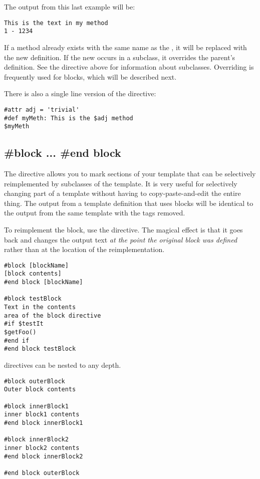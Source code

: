 The output from this last example will be:

\begin{verbatim}
This is the text in my method 
1 - 1234
\end{verbatim}

If a method already exists with the same name as the , it will be replaced
with the new definition.  If the new  occurs in a subclass, it overrides the
parent's definition.  See the  directive above for information about
subclasses.  Overriding is frequently used for blocks, which will be described next.

There is also a single line version of the  directive:

\begin{verbatim}
#attr adj = 'trivial'
#def myMeth: This is the $adj method 
$myMeth
\end{verbatim}


\subsection{\#block ... \#end block}
\label{inheritanceEtc.block}

The  directive allows you to mark sections of your template
that can be selectively reimplemented by subclasses of the template.  It is
very useful for selectively changing part of a template without having to
copy-paste-and-edit the entire thing.  The output from a template definition
that uses blocks will be identical to the output from the same template with
the  tags removed. 

To reimplement the block, use the  directive.  The magical effect is that it
goes back and changes the output text {\em at the point the original block was
defined} rather than at the location of the reimplementation.

\begin{verbatim}
#block [blockName] 
[block contents] 
#end block [blockName]

#block testBlock
Text in the contents 
area of the block directive
#if $testIt
$getFoo() 
#end if
#end block testBlock
\end{verbatim}

 directives can be nested to any depth.

\begin{verbatim}
#block outerBlock
Outer block contents 

#block innerBlock1
inner block1 contents 
#end block innerBlock1

#block innerBlock2
inner block2 contents 
#end block innerBlock2

#end block outerBlock
\end{verbatim}

